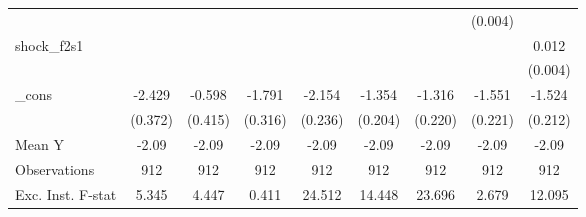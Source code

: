{\begin{tabular}{l*{8}{c}}
            &                     &                     &                     &                     &                     &                     &     (0.004)         &                     \\
\addlinespace
shock\_f2s1  &                     &                     &                     &                     &                     &                     &                     &       0.012\sym{***}\\
            &                     &                     &                     &                     &                     &                     &                     &     (0.004)         \\
\addlinespace
\_cons      &      -2.429\sym{***}&      -0.598         &      -1.791\sym{***}&      -2.154\sym{***}&      -1.354\sym{***}&      -1.316\sym{***}&      -1.551\sym{***}&      -1.524\sym{***}\\
            &     (0.372)         &     (0.415)         &     (0.316)         &     (0.236)         &     (0.204)         &     (0.220)         &     (0.221)         &     (0.212)         \\
\midrule
Mean Y      &       -2.09         &       -2.09         &       -2.09         &       -2.09         &       -2.09         &       -2.09         &       -2.09         &       -2.09         \\
Observations&         912         &         912         &         912         &         912         &         912         &         912         &         912         &         912         \\
Exc. Inst. F-stat&       5.345         &       4.447         &       0.411         &      24.512         &      14.448         &      23.696         &       2.679         &      12.095         \\
\bottomrule
\end{tabular}
}
